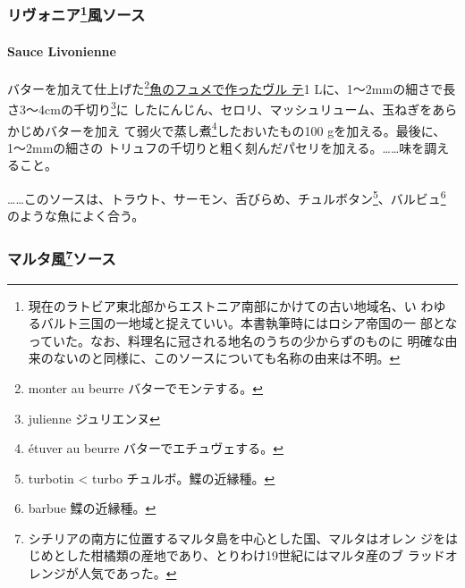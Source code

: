 \begin{recette}
\maeaki

\hypertarget{ux30eaux30f4ux30a9ux30cbux30a264ux98a8ux30bdux30fcux30b9}{%
\subsubsection[リヴォニア風ソース]{\texorpdfstring{リヴォニア\footnote{現在のラトビア東北部からエストニア南部にかけての古い地域名、い
  わゆるバルト三国の一地域と捉えていい。本書執筆時にはロシア帝国の一
  部となっていた。なお、料理名に冠される地名のうちの少からずのものに
  明確な由来のないのと同様に、このソースについても名称の由来は不明。}風ソース}{リヴォニア風ソース}}\label{ux30eaux30f4ux30a9ux30cbux30a264ux98a8ux30bdux30fcux30b9}}

\hypertarget{sauce-livonienne}{%
\paragraph{Sauce Livonienne}\label{sauce-livonienne}}


バターを加えて仕上げた\footnote{monter au beurre バターでモンテする。}\protect\hyperlink{veloute-de-poisson}{魚のフュメで作ったヴル
テ}1 Lに、1〜2mmの細さで長さ3〜4cmの千切り\footnote{julienne
  ジュリエンヌ}に
したにんじん、セロリ、マッシュリューム、玉ねぎをあらかじめバターを加え
て弱火で蒸し煮\footnote{étuver au beurre バターでエチュヴェする。}したおいたもの100
gを加える。最後に、1〜2mmの細さの
トリュフの千切りと粗く刻んだパセリを加える。\ldots{}\ldots{}味を調えること。

\ldots{}\ldots{}このソースは、トラウト、サーモン、舌びらめ、チュルボタン\footnote{turbotin
  \textless{} turbo チュルボ。鰈の近縁種。}、バルビュ\footnote{barbue
  鰈の近縁種。}のような魚によく合う。

\maeaki

\hypertarget{ux30deux30ebux30bfux98a870ux30bdux30fcux30b9}{%
\subsubsection[マルタ風ソース]{\texorpdfstring{マルタ風\footnote{シチリアの南方に位置するマルタ島を中心とした国、マルタはオレン
  ジをはじめとした柑橘類の産地であり、とりわけ19世紀にはマルタ産のブ
  ラッドオレンジが人気であった。}ソース}{マルタ風ソース}}\label{ux30deux30ebux30bfux98a870ux30bdux30fcux30b9}}


\end{recette}
